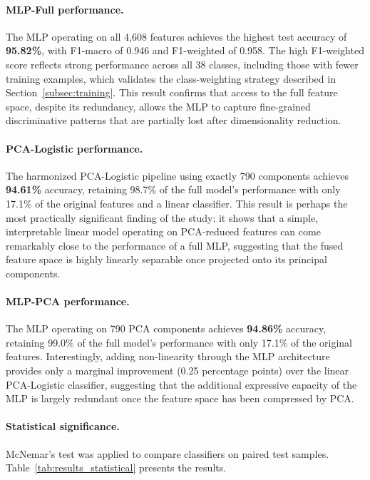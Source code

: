 \documentclass[pdflatex,sn-basic]{sn-jnl}
\begin{document}
\paragraph{MLP-Full performance.}
The MLP operating on all 4,608 features achieves the highest test accuracy of \textbf{95.82\%}, with F1-macro of 0.946 and F1-weighted of 0.958. The high F1-weighted score reflects strong performance across all 38 classes, including those with fewer training examples, which validates the class-weighting strategy described in Section~\ref{subsec:training}. This result confirms that access to the full feature space, despite its redundancy, allows the MLP to capture fine-grained discriminative patterns that are partially lost after dimensionality reduction.

\paragraph{PCA-Logistic performance.}
The harmonized PCA-Logistic pipeline using exactly 790 components achieves \textbf{94.61\%} accuracy, retaining 98.7\% of the full model's performance with only 17.1\% of the original features and a linear classifier. This result is perhaps the most practically significant finding of the study: it shows that a simple, interpretable linear model operating on PCA-reduced features can come remarkably close to the performance of a full MLP, suggesting that the fused feature space is highly linearly separable once projected onto its principal components.

\paragraph{MLP-PCA performance.}
The MLP operating on 790 PCA components achieves \textbf{94.86\%} accuracy, retaining 99.0\% of the full model's performance with only 17.1\% of the original features. Interestingly, adding non-linearity through the MLP architecture provides only a marginal improvement (0.25 percentage points) over the linear PCA-Logistic classifier, suggesting that the additional expressive capacity of the MLP is largely redundant once the feature space has been compressed by PCA.

\paragraph{Statistical significance.}
McNemar's test was applied to compare classifiers on paired test samples. Table~\ref{tab:results_statistical} presents the results.
\end{document}
